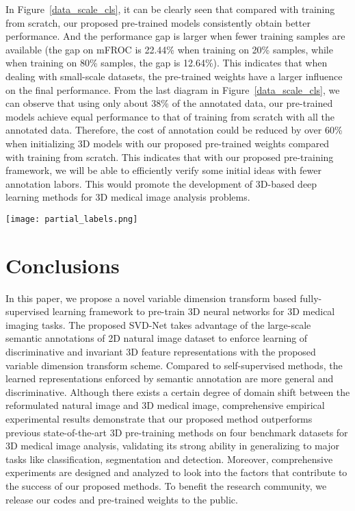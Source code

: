 \documentclass[journal,twoside,web]{ieeecolor}
\begin{document}
In Figure~\ref{data_scale_cls}, it can be clearly seen that compared with training from scratch, our proposed pre-trained models consistently obtain better performance. And the performance gap is larger when fewer training samples are available (the gap on mFROC is 22.44\% when training on 20\% samples, while when training on 80\% samples, the gap is 12.64\%). This indicates that when dealing with small-scale datasets, the pre-trained weights have a larger influence on the final performance. From the last diagram in Figure~\ref{data_scale_cls}, we can observe that using only about 38\% of the annotated data, our pre-trained models achieve equal performance to that of training from scratch with all the annotated data. Therefore, the cost of annotation could be reduced by over 60\% when initializing 3D models with our proposed pre-trained weights compared with training from scratch. This indicates that with our proposed pre-training framework, we will be able to efficiently verify some initial ideas with fewer annotation labors. This would promote the development of 3D-based deep learning methods for 3D medical image analysis problems.

\begin{figure*}\centering
 	\texttt{[image: partial\_labels.png]}
	\caption{Detection performance on the NIH DeepLesion dataset at different annotated data scales.}
	\label{data_scale_cls}
\end{figure*}



\section{Conclusions}
\label{con1}
In this paper, we propose a novel variable dimension transform based fully-supervised learning framework to pre-train 3D neural networks for 3D medical imaging tasks. The proposed SVD-Net takes advantage of the large-scale semantic annotations of 2D natural image dataset to enforce learning of discriminative and invariant 3D feature representations with the proposed variable dimension transform scheme. Compared to self-supervised methods, the learned representations enforced by semantic annotation are more general and discriminative. Although there exists a certain degree of domain shift between the reformulated natural image and 3D medical image, comprehensive empirical experimental results demonstrate that our proposed method outperforms previous state-of-the-art 3D pre-training methods on four benchmark datasets for 3D medical image analysis, validating its strong ability in generalizing to major tasks like classification, segmentation and detection. 
Moreover, comprehensive experiments are designed and analyzed to look into the factors that contribute to the success of our proposed methods. 
To benefit the research community, we release our codes and pre-trained weights to the public.
\end{document}

